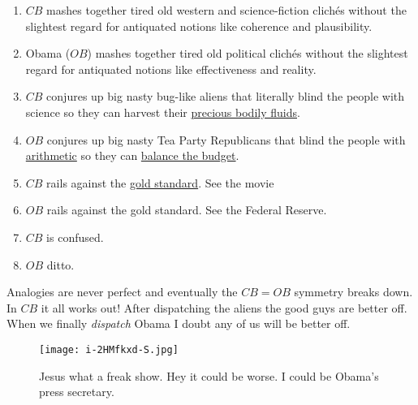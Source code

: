 \begin{enumerate}
\tightlist
\item
  $CB$ mashes together tired old western and science-fiction clichés
  without the slightest regard for antiquated notions like coherence and
  plausibility.
\item
  Obama ($OB$) mashes together tired old political clichés without the
  slightest regard for antiquated notions like effectiveness and
  reality.
\item
  $CB$ conjures up big nasty bug-like aliens that literally blind the
  people with science so they can harvest their
  \href{http://www.youtube.com/watch?v=N1KvgtEnABY}{precious bodily
  fluids}.
\item
  $OB$ conjures up big nasty Tea Party Republicans that blind the people
  with \href{http://www.ardue.org.uk/world/finarith.html}{arithmetic} so
  they can
  \href{http://www.thedailylink.org/2005/04/good-god-just-balance-fucking-budget.html}{balance
  the budget}.
\item
  $CB$ rails against the
  \href{http://www.econlib.org/library/Enc/GoldStandard.html}{gold
  standard}. See the movie
\item
  $OB$ rails against the gold standard. See the Federal Reserve.
\item
  $CB$ is confused.
\item
  $OB$ ditto.
\end{enumerate}



Analogies are never perfect and eventually the $CB = OB$ symmetry
breaks down. In $CB$ it all works out! After dispatching the aliens the
good guys are better off. When we finally \emph{dispatch} Obama I doubt
any of us will be better off.

\captionsetup[figure]{labelformat=empty}
\begin{SCfigure}[1][!b]
  \centering
  \texttt{[image: i-2HMfkxd-S.jpg]}
  \caption[Jesus  what a freak show]{Jesus  what a freak show. Hey it could be worse. I could be Obama's press  secretary.}
  \label{fig:1698X2}
\end{SCfigure}

